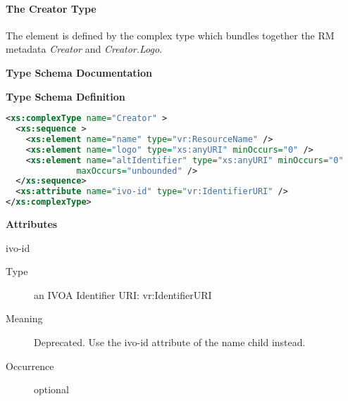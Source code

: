 \documentclass[11pt,a4paper]{ivoa}
\begin{document}


\paragraph{The Creator Type}

The  element is defined by the  complex
type which bundles together the RM metadata \emph{Creator} and
\emph{Creator.Logo}.



\begin{generated}
\begingroup
        \renewcommand*\descriptionlabel[1]{%
        \hbox to 5.5em{\emph{#1}\hfil}}\vspace{2ex}\noindent\textbf{ Type Schema Documentation}


\vspace{1ex}\noindent\textbf{ Type Schema Definition}

\begin{lstlisting}[language=XML,basicstyle=\footnotesize]
<xs:complexType name="Creator" >
  <xs:sequence >
    <xs:element name="name" type="vr:ResourceName" />
    <xs:element name="logo" type="xs:anyURI" minOccurs="0" />
    <xs:element name="altIdentifier" type="xs:anyURI" minOccurs="0"
              maxOccurs="unbounded" />
  </xs:sequence>
  <xs:attribute name="ivo-id" type="vr:IdentifierURI" />
</xs:complexType>
\end{lstlisting}

\vspace{0.5ex}\noindent\textbf{ Attributes}

\begingroup\small\begin{bigdescription}
\item[ivo-id]
\begin{description}
\item[Type] an IVOA Identifier URI: vr:IdentifierURI
\item[Meaning]
           	Deprecated.  Use the ivo-id attribute of the name child instead.

\item[Occurrence] optional

\end{description}



\end{bigdescription}
\end{generated}
\end{document}
